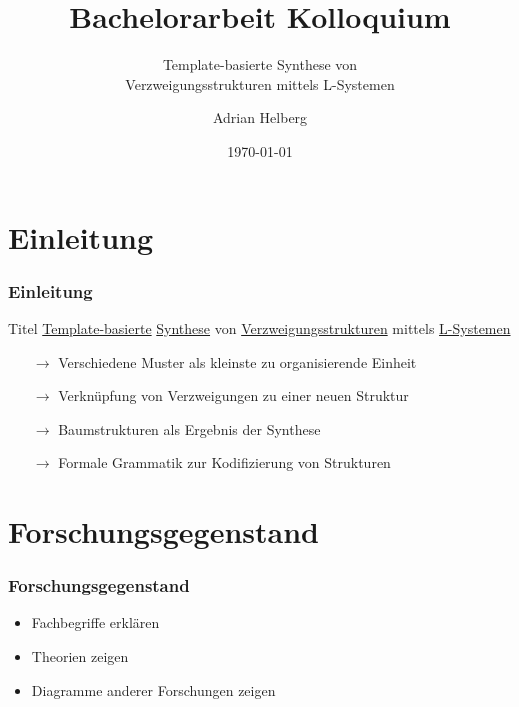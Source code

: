 \documentclass[12pt]{beamer}
\subtitle{Template-basierte Synthese von\\Verzweigungsstrukturen mittels L-Systemen}
\title{Bachelorarbeit Kolloquium}
\author{Adrian Helberg}
\institute{HAW Hamburg}
\date{\today}
\begin{document}
    \frame{\titlepage}

    \section{Einleitung}
    \label{sec:thema}
    \begin{frame}[allowframebreaks]
        \frametitle{Einleitung}

        \begin{block}{Titel}
            \color{olive}\underline{\color{black}Template-basierte} \color{teal}\underline{\color{black}Synthese} 
            \color{black}von \color{orange}\underline{\color{black}Verzweigungsstrukturen} \color{black}mittels 
            \color{cyan}\underline{\color{black}L-Systemen}
        \end{block}

        \begin{itemize}
            \item[\color{olive}$\rightarrow$] \color{black}Verschiedene Muster als kleinste zu organisierende Einheit
            \item[\color{teal}$\rightarrow$] \color{black}Verknüpfung von Verzweigungen zu einer neuen Struktur
            \item[\color{orange}$\rightarrow$] \color{black}Baumstrukturen als Ergebnis der Synthese
            \item[\color{cyan}$\rightarrow$] \color{black}Formale Grammatik zur Kodifizierung von Strukturen
        \end{itemize}
    \end{frame}

    \section{Forschungsgegenstand}
    \label{sec:forschungsgegenstand}
    \begin{frame}
        \frametitle{Forschungsgegenstand}

        \begin{itemize}
            \item Fachbegriffe erklären
            \item Theorien zeigen
            \item Diagramme anderer Forschungen zeigen
        \end{itemize}
    \end{frame}
\end{document}
